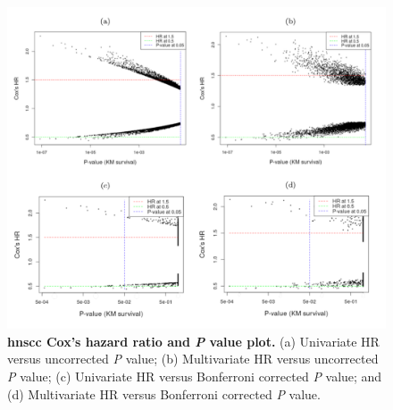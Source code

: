 \documentclass[12pt, a4paper]{article}
\newcommand{\bcaption}[2]{\caption{\textbf{#1} #2}}
\begin{document}
\begin{figure}[hp]
\centering
\includegraphics[width=14cm]{Figure2.pdf}
\bcaption{\acrshort{hnscc} Cox's hazard ratio and \textit{P} value plot.}
{(a) Univariate HR versus uncorrected \textit{P} value; (b) Multivariate HR versus uncorrected \textit{P} value; (c) Univariate HR versus Bonferroni corrected \textit{P} value; and (d) Multivariate HR versus Bonferroni corrected \textit{P} value.}
\label{fig:figure2}
\end{figure}

\end{document}
